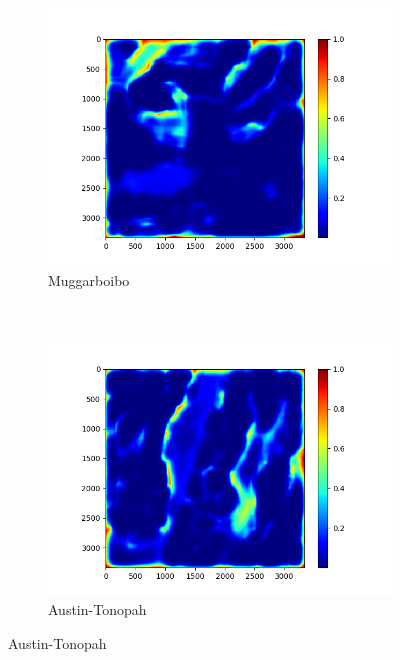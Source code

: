 \documentclass[11pt,a4paper]{article}
\begin{document}
\begin{figure}[t]
    \begin{subfigure}[b]{0.45\textwidth}
        \includegraphics[width=\textwidth]{graphics/training/train_on_01_features_01234/heatmaps_faults_2.png}
        \caption{Muggarboibo}
        \label{fig:heatmaps_2_Muggarboibo}
    \end{subfigure}
    ~
    \begin{subfigure}[b]{0.45\textwidth}
        \includegraphics[width=\textwidth]{graphics/training/train_on_01_features_01234/heatmaps_faults_3.png}
        \caption{Austin-Tonopah}
        \label{fig:heatmaps_2_Austin-Tonopah}
    \end{subfigure}


\end{figure}
\end{document}
